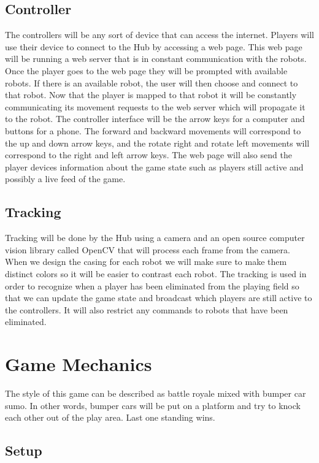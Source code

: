 \documentclass[11pt]{ieeeconf}
\begin{document}
\subsection{Controller}

The controllers will be any sort of device that can access the internet. Players will use their device to connect to the Hub by accessing a web page. This web page will be running a web server that is in constant communication with the robots. Once the player goes to the web page they will be prompted with available robots. If there is an available robot, the user will then choose and connect to that robot. Now that the player is mapped to that robot it will be constantly communicating its movement requests to the web server which will propagate it to the robot. The controller interface will be the arrow keys for a computer and buttons for a phone. The forward and backward movements will correspond to the up and down arrow keys, and the rotate right and rotate left movements will correspond to the right and left arrow keys. The web page will also send the player devices information about the game state such as players still active and possibly a live feed of the game.

\subsection{Tracking}

Tracking will be done by the Hub using a camera and an open source computer vision library called OpenCV that will process each frame from the camera. When we design the casing for each robot we will make sure to make them distinct colors so it will be easier to contrast each robot. The tracking is used in order to recognize when a player has been eliminated from the playing field so that we can update the game state and broadcast which players are still active to the controllers. It will also restrict any commands to robots that have been eliminated.

\section{Game Mechanics}

The style of this game can be described as battle royale mixed with bumper car sumo. In other words, bumper cars will be put on a platform and try to knock each other out of the play area. Last one standing wins. 

\subsection{Setup}
\end{document}
